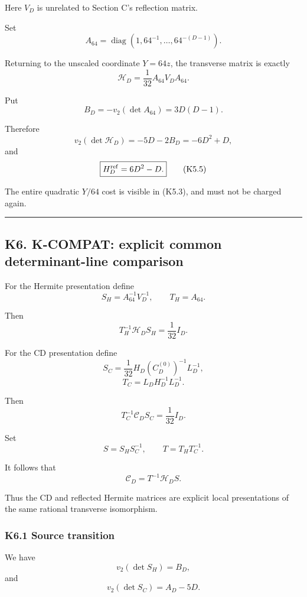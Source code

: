 \documentclass[
  10pt,
  letterpaper,
]{article}
\theoremstyle{definition}
\theoremstyle{remark}
\begin{document}
Here \(V_D\) is unrelated to Section C's reflection matrix.

Set \[
A_{64}
=
\operatorname{diag}
(1,64^{-1},\ldots,64^{-(D-1)}).
\tag{K5.2}
\]

Returning to the unscaled coordinate \(Y=64z\), the transverse matrix is
exactly \[
\boxed{
\mathcal H_D
=
\frac1{32}A_{64}V_DA_{64}.
}
\tag{K5.3}
\]

Put \[
B_D=-v_2(\det A_{64})
=3D(D-1).
\tag{K5.4}
\]

Therefore \[
v_2(\det\mathcal H_D)
=
-5D-2B_D
=
-6D^2+D,
\] and \[
\boxed{
H_D^{\rm ref}=6D^2-D.
}
\tag{K5.5}
\]

The entire quadratic \(Y/64\) cost is visible in (K5.3), and must not be
charged again.

\begin{center}\rule{0.5\linewidth}{0.5pt}\end{center}

\subsection{K6. K-COMPAT: explicit common determinant-line
comparison}\label{k6.-k-compat-explicit-common-determinant-line-comparison}

For the Hermite presentation define \[
S_H=A_{64}^{-1}V_D^{-1},
\qquad
T_H=A_{64}.
\tag{K6.1}
\]

Then \[
\boxed{
T_H^{-1}\mathcal H_DS_H
=
\frac1{32}I_D.
}
\tag{K6.2}
\]

For the CD presentation define \[
S_C
=
\frac1{32}H_D(C_D^{(0)})^{-1}L_D^{-1},
\tag{K6.3}
\] \[
T_C
=
L_DH_D^{-1}L_D^{-1}.
\tag{K6.4}
\]

Then \[
\boxed{
T_C^{-1}\mathcal C_DS_C
=
\frac1{32}I_D.
}
\tag{K6.5}
\]

Set \[
S=S_HS_C^{-1},
\qquad
T=T_HT_C^{-1}.
\tag{K6.6}
\]

It follows that \[
\boxed{
\mathcal C_D=T^{-1}\mathcal H_DS.
}
\tag{K6.7}
\]

Thus the CD and reflected Hermite matrices are explicit local
presentations of the same rational transverse isomorphism.

\subsubsection{K6.1 Source transition}\label{k6.1-source-transition}

We have \[
v_2(\det S_H)=B_D,
\] and \[
v_2(\det S_C)=A_D-5D.
\]
\end{document}

